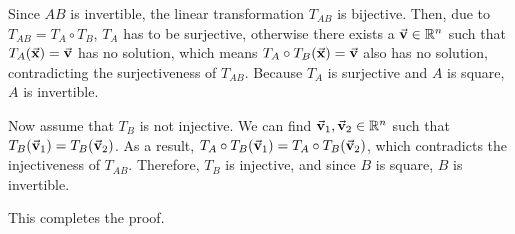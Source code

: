 \documentclass{article}
\begin{document}
\begin{exercise}{15}
Since $AB$ is invertible, the linear transformation $T_{AB}$ is bijective. Then, due to $T_{AB} = T_A \circ T_B$, $T_A$ has to be surjective, otherwise there exists a $\vec{\mathbf{v}} \in \mathbb{R}^n$ such that $T_A(\vec{\mathbf{x}}) = \vec{\mathbf{v}}$ has no solution, which means $T_A \circ T_B(\vec{\mathbf{x}}) = \vec{\mathbf{v}}$ also has no solution, contradicting the surjectiveness of $T_{AB}$. Because $T_A$ is surjective and $A$ is square, $A$ is invertible.

Now assume that $T_B$ is not injective. We can find $\vec{\mathbf{v}}_1, \vec{\mathbf{v}}_2 \in \mathbb{R}^n$ such that $T_B(\vec{\mathbf{v}}_1) = T_B(\vec{\mathbf{v}}_2)$. As a result, $T_A \circ T_B(\vec{\mathbf{v}}_1) = T_A \circ T_B(\vec{\mathbf{v}}_2)$, which contradicts the injectiveness of $T_{AB}$. Therefore, $T_B$ is injective, and since $B$ is square, $B$ is invertible.

This completes the proof. \rQED
\end{exercise}
\end{document}
